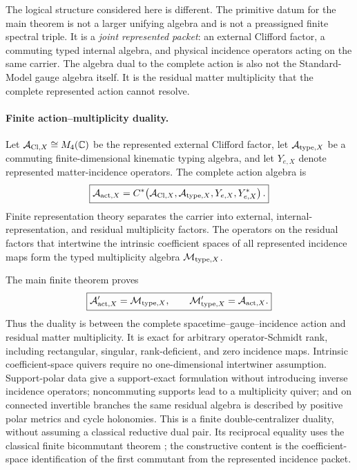 \documentclass[11pt]{article}
\numberwithin{equation}{section}
\theoremstyle{definition}
\theoremstyle{remark}
\newcommand{\C}{\mathbb C}
\newcommand{\A}{\mathcal A}
\newcommand{\M}{\mathcal M}
\begin{document}
The logical structure considered here is different.  The primitive datum for
the main theorem is not a larger unifying algebra and is not a preassigned
finite spectral triple.  It is a \emph{joint represented packet}: an external
Clifford factor, a commuting typed internal algebra, and physical incidence
operators acting on the same carrier.  The algebra dual to the complete
action is also not the Standard-Model gauge algebra itself.  It is the
residual matter multiplicity that the complete represented action cannot
resolve.


\paragraph{Finite action--multiplicity duality.}

Let $\A_{{\rm Cl},X}\cong M_4(\C)$ be the represented external Clifford
factor, let $\A_{{\rm type},X}$ be a commuting finite-dimensional kinematic
typing algebra, and let $Y_{e,X}$ denote represented matter-incidence
operators.  The complete action algebra is
\begin{equation}
\boxed{
\A_{{\rm act},X}
=
C^*\!\left(
\A_{{\rm Cl},X},
\A_{{\rm type},X},
Y_{e,X},Y_{e,X}^*
\right).}
\label{eq:intro-action-algebra}
\end{equation}
Finite representation theory separates the carrier into external,
internal-representation, and residual multiplicity factors.  The operators
on the residual factors that intertwine the intrinsic coefficient spaces of
all represented incidence maps form the typed multiplicity algebra
$\M_{{\rm type},X}$.

The main finite theorem proves
\begin{equation}
\boxed{
\A_{{\rm act},X}'
=
\M_{{\rm type},X},
\qquad
\M_{{\rm type},X}'
=
\A_{{\rm act},X}.}
\label{eq:intro-main-duality}
\end{equation}
Thus the duality is between the complete
spacetime--gauge--incidence action and residual matter multiplicity.  It is
exact for arbitrary operator-Schmidt rank, including rectangular, singular,
rank-deficient, and zero incidence maps.  Intrinsic coefficient-space quivers
require no one-dimensional intertwiner assumption.  Support-polar data give a support-exact formulation without introducing inverse
incidence operators; noncommuting supports lead to a multiplicity quiver; and
on connected invertible branches the same residual algebra is described by
positive polar metrics and cycle holonomies.  This is a finite double-centralizer duality, without assuming a classical
reductive dual pair.  Its reciprocal equality uses the classical finite
bicommutant theorem \cite{EtingofEtAl2011}; the constructive content is the
coefficient-space identification of the first commutant from the represented
incidence packet.
\end{document}
